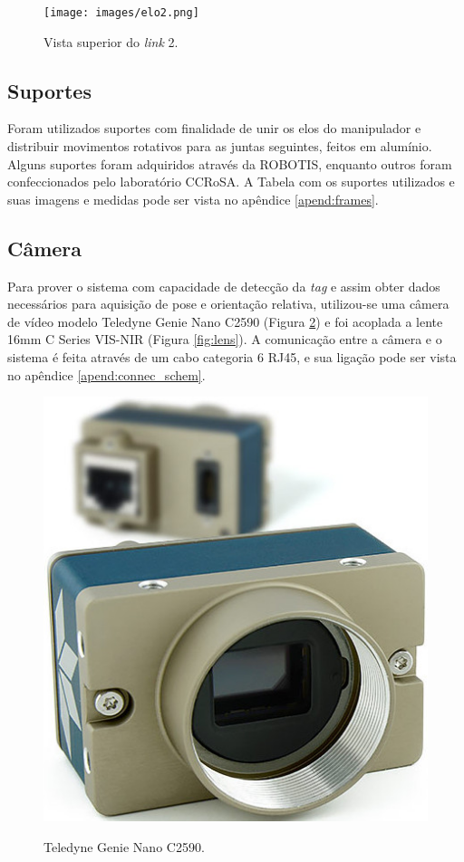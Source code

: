 \begin{figure}[H]
    \centering
    \caption{Vista superior do \textit{link} 2.}
    \texttt{[image: images/elo2.png]}
    \label{fig:elo2}
\end{figure}



\subsection{Suportes}
Foram utilizados suportes com finalidade de unir os elos do manipulador e distribuir movimentos rotativos para as juntas seguintes, feitos em alumínio. Alguns suportes foram adquiridos através da ROBOTIS, enquanto outros foram confeccionados pelo laboratório CCRoSA. A Tabela com os suportes utilizados e suas imagens e medidas pode ser vista no apêndice \ref{apend:frames}.



\subsection{Câmera}

Para prover o sistema com capacidade de detecção da \emph{tag} e assim obter dados necessários para aquisição de pose e orientação relativa, utilizou-se uma câmera de vídeo modelo Teledyne Genie Nano C2590 (Figura \ref{fig:genie-nano}) e foi acoplada a lente 16mm C Series VIS-NIR (Figura \ref{fig:lens}). A comunicação entre a câmera e o sistema é feita através de um cabo categoria 6 RJ45, e sua ligação pode ser vista no apêndice \ref{apend:connec_schem}.

\begin{figure}[H]
  \centering
  \caption{Teledyne Genie Nano C2590.}
  \includegraphics[scale=0.3]{images/genie-nano.jpg}
  \label{fig:genie-nano}
\end{figure}

